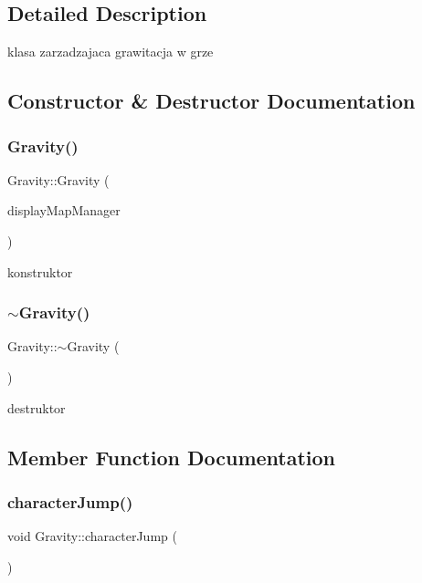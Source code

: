 \subsection{Detailed Description}
klasa zarzadzajaca grawitacja w grze 

\subsection{Constructor \& Destructor Documentation}
\mbox{\label{class_gravity_a366c547f2ab1425b5e6981b15a55852d}} 
\subsubsection{\texorpdfstring{Gravity()}{Gravity()}}
{\footnotesize\ttfamily Gravity\+::\+Gravity (\begin{DoxyParamCaption}\item[{\hyperlink{class_display_map_manager}{Display\+Map\+Manager} $\ast$}]{display\+Map\+Manager }\end{DoxyParamCaption})}

konstruktor \mbox{\label{class_gravity_a6fcaf5f5f0d4672c4a1d97a3102e053a}} 
\subsubsection{\texorpdfstring{$\sim$\+Gravity()}{~Gravity()}}
{\footnotesize\ttfamily Gravity\+::$\sim$\+Gravity (\begin{DoxyParamCaption}{ }\end{DoxyParamCaption})}

destruktor 

\subsection{Member Function Documentation}
\mbox{\label{class_gravity_adb2abc628833f3424ad3ddb93e581290}} 
\subsubsection{\texorpdfstring{character\+Jump()}{characterJump()}}
{\footnotesize\ttfamily void Gravity\+::character\+Jump (\begin{DoxyParamCaption}{ }\end{DoxyParamCaption})}

